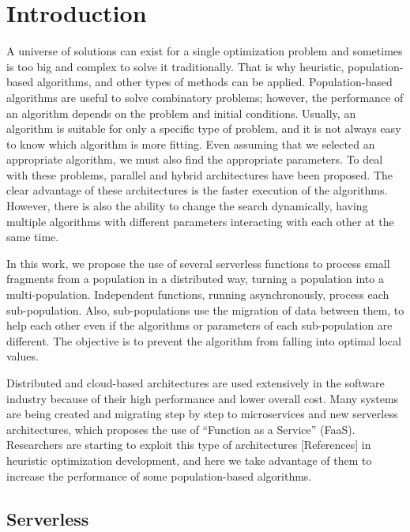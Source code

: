 \documentclass[runningheads]{llncs}
\begin{document}
\section{Introduction}
A universe of solutions can exist for a single optimization problem and
sometimes is too big and complex to solve it traditionally. That is why
heuristic, population-based algorithms, and other types of methods can be
applied.  Population-based algorithms are useful to solve combinatory problems;
however,  the performance of an algorithm depends on the problem and initial
conditions. Usually, an algorithm is suitable for only a specific type of
problem, and it is not always easy to know which algorithm is more fitting. Even
assuming that we selected an appropriate algorithm, we must also find the
appropriate parameters. To deal with these problems, parallel and hybrid
architectures have been proposed. The clear advantage of these architectures is
the faster execution of the algorithms. However, there is also the ability to
change the search dynamically, having multiple algorithms with different
parameters interacting with each other at the same time. 

In this work, we propose the use of several serverless functions to process
small fragments from a population in a distributed way, turning a population
into a multi-population. Independent functions, running asynchronously,
process each sub-population. Also, sub-populations use the migration of data
between them, to help each other even if the algorithms or parameters of each
sub-population are different. The objective is to prevent the algorithm from
falling into optimal local values.

Distributed and cloud-based architectures are used extensively in the software
industry because of their high performance and lower overall cost.  Many systems
are being created and migrating step by step to microservices and new serverless
architectures, which proposes the use of “Function as a Service” (FaaS).
Researchers are starting to exploit this type of architectures [References] in
heuristic optimization development, and here we take advantage of them to
increase the performance of some population-based algorithms.



\subsection{Serverless}
\end{document}
